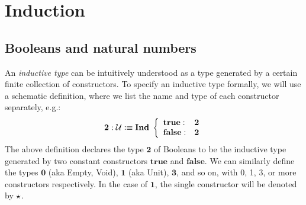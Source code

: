 \newcommand{\zero}{\ensuremath{\mathbf{0}}\xspace}
\newcommand{\one}{\ensuremath{\mathbf{1}}\xspace}
\newcommand{\two}{{\ensuremath{\mathbf{2}}}\xspace}
\newcommand{\twoh}{\ensuremath{\mathbf{2^h}}\xspace}
\newcommand{\three}{\ensuremath{\mathbf{3}}\xspace}
\newcommand{\natw}{\ensuremath{\mathbf{N^w}}\xspace}
\newcommand{\nath}{\ensuremath{\mathbf{N^h}}\xspace}
\newcommand{\true}{\ensuremath{\mathbf{true}}\xspace}
\newcommand{\false}{\ensuremath{\mathbf{false}}\xspace}
\newcommand{\supp}{\ensuremath{\mathbf{sup}}\xspace}
\newcommand{\z}{\ensuremath{0}\xspace}
\newcommand{\zw}{\ensuremath{0^\mathbf{w}}\xspace}
\newcommand{\wtype}[1]{\ensuremath{W}(#1),\xspace}
\newcommand{\wtypeh}[1]{\ensuremath{W^h}(#1),\xspace}
\newcommand{\myInd}{\ensuremath{\mathbf{Ind \;}}\xspace}
\let\s\suc
\newcommand{\sw}{\ensuremath{\mathbf{s^w}}\xspace}
\newcommand{\alt}{\;|\;\;}
\newcommand{\disj}[2]{#1 + #2}
\newcommand{\der}{\vdash}
\newcommand{\dbl}{\ensuremath{\mathbf{double}}}
\newcommand{\nalg}{\mathsf{\nat Alg}}
\newcommand{\nhom}{\mathsf{\nat Hom}}
\newcommand{\ishinitw}{\ensuremath{\mathsf{isHinit_W}}}
\newcommand{\ishinitn}{\ensuremath{\mathsf{isHinit_\nat}}}
\newcommand{\w}{\mathsf{W}}
\newcommand{\walg}{\mathsf{\w Alg}}
\newcommand{\whom}{\mathsf{\w Hom}}

\chapter{Induction}
\label{cha:induction}

\section{Booleans and natural numbers}
\label{sec:bool-nat}

An \emph{inductive type} can be intuitively understood as a type generated by a certain finite collection of constructors. To specify an inductive type formally,
we will use a schematic definition, where we list the name and type of each constructor separately, e.g.:
\[ \two : \type \defeq \myInd \left\{ 
\begin{array}{ll}
\true : &\two \\
\false : &\two
\end{array}
\right. \]     
The above definition declares the type $\two$ of Booleans to be the inductive type generated by two constant constructors $\true$ and $\false$. We can similarly define the types $\zero$ (aka Empty, Void), $\one$ (aka Unit), $\three$, and so on, with 0, 1, 3, or more constructors respectively. In the case of $\one$, the single constructor will be denoted by $\star$.

